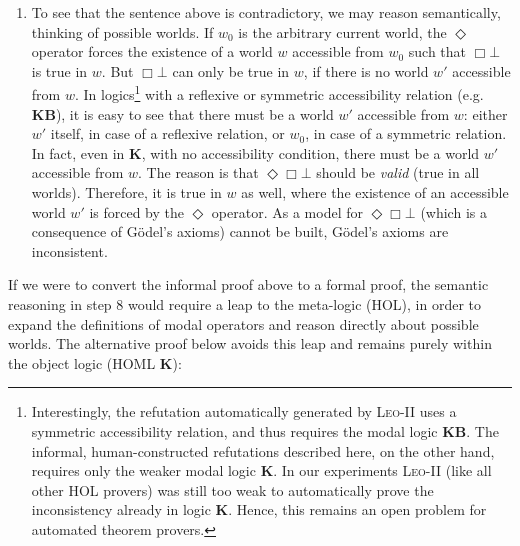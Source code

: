 \documentclass{llncs}
\newcommand{\logic}[1]{\textbf{#1}\xspace}
\newcommand{\KB}{\logic{KB}}
\newcommand{\K}{\logic{K}}
\newcommand{\Dia}{\Diamond} %
\newcommand{\nec}{\Box}
\newcommand{\pos}{\Dia}
\begin{document}
\begin{enumerate}
\item To see that the sentence above is contradictory, we may reason semantically, thinking of possible worlds. If $w_0$ is the arbitrary current world, the $\pos$ operator forces the existence of a world $w$ accessible from $w_0$ such that $\nec \bot$ is true in $w$. But $\nec \bot$ can only be true in $w$, if there is no world $w'$ accessible from $w$. In logics\footnote{
  Interestingly, the refutation automatically generated by
  \textsc{Leo-II} uses a symmetric accessibility relation, and thus
  requires the modal logic \KB. The informal, human-constructed
  refutations described here, on the other hand, requires only the
  weaker modal logic \K. In our experiments \textsc{Leo-II} (like all
  other HOL provers) was still too weak to automatically prove the
  inconsistency already in logic \K. Hence, this remains an open problem for automated
  theorem provers.
} with a reflexive or symmetric accessibility relation (e.g. \KB), it is easy to see that there must be a world $w'$ accessible from $w$: either $w'$ itself, in case of a reflexive relation, or $w_0$, in case of a symmetric relation. In fact, even in \K, with no accessibility condition, there must be a world $w'$ accessible from $w$. The reason is that $\pos \nec \bot$ should be \emph{valid} (true in all worlds). Therefore, it is true in $w$ as well, where the existence of an accessible world $w'$ is forced by the $\pos$ operator. As a model for $\pos \nec \bot$ (which is a consequence of G\"odel's axioms) cannot be built, G\"odel's axioms are inconsistent.
\end{enumerate}

If we were to convert the informal proof above to a formal proof, the semantic reasoning in step 8 would require a leap to the meta-logic (HOL), in order to expand the definitions of modal operators and reason directly about possible worlds. The alternative proof below avoids this leap and remains purely within the object logic (HOML \K):
\end{document}
